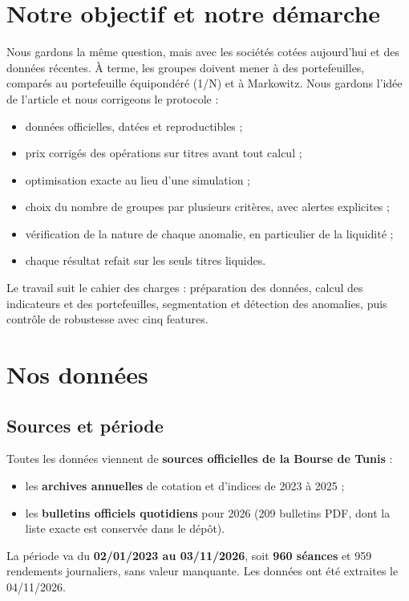 \documentclass[11pt,a4paper]{article}
\begin{document}
\section{Notre objectif et notre démarche}\label{sec:notre-objectif}
Nous gardons la même question, mais avec les sociétés cotées aujourd'hui et des données récentes. À terme, les groupes doivent mener à des portefeuilles, comparés au portefeuille équipondéré (1/N) et à Markowitz. Nous gardons l'idée de l'article et nous corrigeons le protocole :
\begin{itemize}
  \item données officielles, datées et reproductibles ;
  \item prix corrigés des opérations sur titres avant tout calcul ;
  \item optimisation exacte au lieu d'une simulation ;
  \item choix du nombre de groupes par plusieurs critères, avec alertes explicites ;
  \item vérification de la nature de chaque anomalie, en particulier de la liquidité ;
  \item chaque résultat refait sur les seuls titres liquides.
\end{itemize}
Le travail suit le cahier des charges : préparation des données, calcul des indicateurs et des portefeuilles, segmentation et détection des anomalies, puis contrôle de robustesse avec cinq features.

\section{Nos données}\label{sec:donnees}
\subsection{Sources et période}
Toutes les données viennent de \textbf{sources officielles de la Bourse de Tunis} :
\begin{itemize}
  \item les \textbf{archives annuelles} de cotation et d'indices de 2023 à 2025 ;
  \item les \textbf{bulletins officiels quotidiens} pour 2026 (209 bulletins PDF, dont la liste exacte est conservée dans le dépôt).
\end{itemize}
La période va du \textbf{02/01/2023 au 03/11/2026}, soit \textbf{960 séances} et 959 rendements journaliers, sans valeur manquante. Les données ont été extraites le 04/11/2026.
\end{document}
